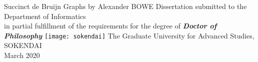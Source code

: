 \documentclass[11pt,a4paper]{report}
\numberwithin{lemma}{chapter}
\numberwithin{theorem}{chapter}
\begin{document}

\newcommand\circrow{\leavevmode\xleaders\hbox{\scalebox{2}{$\mkern.5mu\bigcirc\mkern.5mu$}}\hfill\kern0pt}
\begin{center}
\fontsize{20}{19.2}\selectfont  
Succinct de Bruijn Graphs
\vskip8mm
\fontsize{16}{19.2}\selectfont  
by
\vskip4.5mm
Alexander BOWE
\vskip1.7cm
Dissertation
\vskip8mm
{\Large
submitted to the Department of Informatics\\[-6pt]
in partial fulfillment of the requirements for the degree of}
\vskip1.5cm
\emph{\bfseries Doctor of Philosophy}
\vskip9mm
\texttt{[image: sokendai]}
\vskip1.1cm
{\Large The Graduate University for Advanced Studies, SOKENDAI\\[-5pt]
March 2020}
\end{center}  
\restoregeometry
\clearpage




\end{document}
